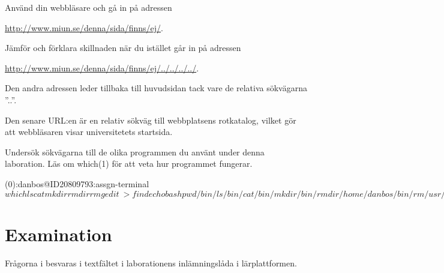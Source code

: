 \documentclass[a4paper]{miunasgn}
\begin{document}
\begin{questions}
	\question\label{q:RelativeWWW}
	Använd din webbläsare och gå in på adressen
	\begin{center}
		\url{http://www.miun.se/denna/sida/finns/ej/}.
	\end{center}
	Jämför och förklara skillnaden när du istället går in på adressen
	\begin{center}
		\url{http://www.miun.se/denna/sida/finns/ej/../../../../}.
	\end{center}
	\begin{solution}
		Den andra adressen leder tillbaka till huvudsidan tack vare de relativa
		sökvägarna ''..''.
	\end{solution}
	\begin{solution}
		Den senare URL:en är en relativ sökväg till webbplatsens rotkatalog, vilket 
		gör att webbläsaren visar universitetets startsida.
	\end{solution}

	\question\label{q:which}
	Undersök sökvägarna till de olika programmen du använt under denna 
	laboration.
	Läs om which(1) för att veta hur programmet fungerar.
	\begin{solution}
		\begin{terminal}
(0):danbos@ID20809793:assgn-terminal$ which ls cat mkdir rmdir rm gedit \
> find echo bash pwd
/bin/ls
/bin/cat
/bin/mkdir
/bin/rmdir
/home/danbos/bin/rm
/usr/bin/gedit
/usr/bin/find
/bin/echo
/bin/bash
/bin/pwd
(0):danbos@ID20809793:assgn-terminal$
		\end{terminal}
	\end{solution}


\end{questions}


\section{Examination}
\label{sec:Examination}
\noindent
Frågorna i  besvaras i textfältet i laborationens 
inlämningslåda i lärplattformen.



\end{document}

